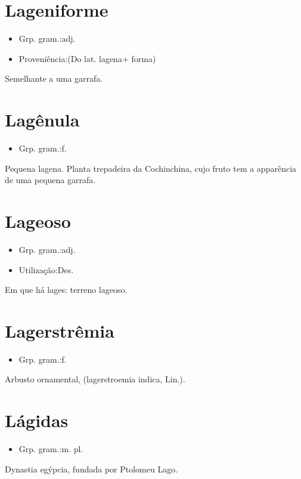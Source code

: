 \section{Lageniforme}
\begin{itemize}
\item {Grp. gram.:adj.}
\end{itemize}
\begin{itemize}
\item {Proveniência:(Do lat. \textunderscore lagena\textunderscore  + \textunderscore forma\textunderscore )}
\end{itemize}
Semelhante a uma garrafa.
\section{Lagênula}
\begin{itemize}
\item {Grp. gram.:f.}
\end{itemize}
Pequena lagena.
Planta trepadeira da Cochinchina, cujo fruto tem a apparência de uma pequena garrafa.
\section{Lageoso}
\begin{itemize}
\item {Grp. gram.:adj.}
\end{itemize}
\begin{itemize}
\item {Utilização:Des.}
\end{itemize}
Em que há lages: \textunderscore terreno lageoso\textunderscore .
\section{Lagerstrêmia}
\begin{itemize}
\item {Grp. gram.:f.}
\end{itemize}
Arbusto ornamental, (\textunderscore lagerstroemia indica\textunderscore , Lin.).
\section{Lágidas}
\begin{itemize}
\item {Grp. gram.:m. pl.}
\end{itemize}
Dynastia egýpcia, fundada por Ptolomeu Lago.
